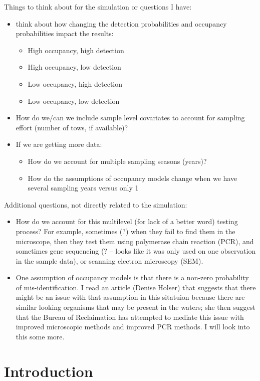 \documentclass[12pt]{article}\usepackage[]{graphicx}\usepackage[]{color}
\begin{document}
Things to think about for the simulation or questions I have: 
\begin{itemize}
\item think about how changing the detection probabilities and occupancy probabilities impact the results: 
	\begin{itemize}
	\item High occupancy, high detection
	\item High occupancy, low detection 
	\item Low occupancy, high detection 
	\item Low occupancy, low detection 
	\end{itemize}
\item How do we/can we include sample level covariates to account for sampling effort (number of tows, if available)?
\item If we are getting more data:
	\begin{itemize}
	\item How do we account for multiple sampling seasons (years)? 
	\item How do the assumptions of occupancy models change when we have several sampling years versus only 1
\end{itemize}
\end{itemize}

Additional questions, not directly related to the simulation:
\begin{itemize}
	\item How do we account for this multilevel (for lack of a better word) testing process? For example, sometimes (?) when they fail to find them in the microscope, then they test them using polymerase chain reaction (PCR), and sometimes gene sequencing (? -- looks like it was only used on one observation in the sample data), or scanning electron microscopy (SEM).
	\item One assumption of occupancy models is that there is a non-zero probability of mis-identification. I read an article (Denise Holser) that suggests that there might be an issue with that assumption in this sitatuion because there are similar looking organisms that may be present in the waters; she then suggest that the Bureau of Reclaimation has attempted to mediate this issue with improved microscopic methods and improved PCR methods. I will look into this some more.   
\end{itemize}


\section{Introduction}
\end{document}
